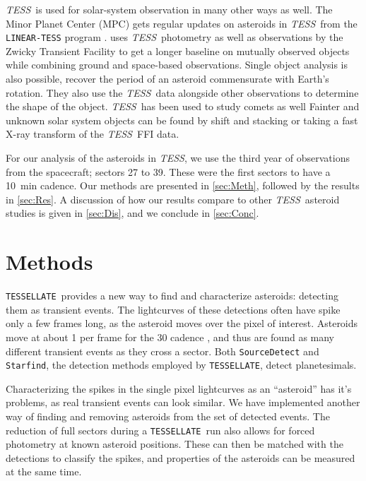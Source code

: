 \documentclass[12pt]{article}
\newcommand{\ttt}{\texttt}
\newcommand{\tess}{\textit{TESS}}
\newcommand{\tessellate}{\texttt{TESSELLATE}}
\begin{document}
\tess\ is used for solar-system observation in many other ways as well.
The Minor Planet Center (MPC) gets regular updates on asteroids in \tess\ from the \ttt{LINEAR-TESS} program \citep{Woods2021}.
\citet{Gowanlock2024} uses \tess\ photometry as well as observations by the Zwicky Transient Facility \citep[ZTF, ][]{Bellm2019} to get a longer baseline on mutually observed objects while combining ground and space-based observations.
Single object analysis is also possible, \citet{Humes2024} recover the period of an asteroid commensurate with Earth's rotation.
They also use the \tess\ data alongside other observations to determine the shape of the object.
\tess\ has been used to study comets as well \citep[e.g.][]{Ridden-Harper2021b}
Fainter and unknown solar system objects can be found by shift and stacking \citep{Holman2019, Payne2019, Rice2020} or taking a fast X-ray transform \citep{Nguyen2024} of the \tess\ FFI data.

For our analysis of the asteroids in \tess, we use the third year of observations from the spacecraft; sectors 27 to 39.
These were the first sectors to have a \qty{10}{\minute} cadence.
Our methods are presented in \autoref{sec:Meth}, followed by the results in \autoref{sec:Res}.
A discussion of how our results compare to other \tess\ asteroid studies is given in \autoref{sec:Dis}, and we conclude in \autoref{sec:Conc}.

\section{Methods}\label{sec:Meth}

\tessellate\ provides a new way to find and characterize asteroids: detecting them as transient events.
The lightcurves of these detections often have spike only a few frames long, as the asteroid moves over the pixel of interest.
Asteroids move at about \qty{1}{\px} per frame for the \qty{30}{\min} cadence \citep{Pal2018}, and thus are found as many different transient events as they cross a sector.
Both \ttt{SourceDetect} and \ttt{Starfind}, the detection methods employed by \tessellate, detect planetesimals.

Characterizing the spikes in the single pixel lightcurves as an ``asteroid'' has it's problems, as real transient events can look similar.
We have implemented another way of finding and removing asteroids from the set of detected events.
The reduction of full sectors during a \tessellate\ run also allows for forced photometry at known asteroid positions.
These can then be matched with the detections to classify the spikes, and properties of the asteroids can be measured at the same time.
\end{document}
